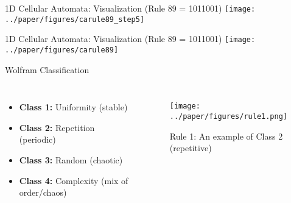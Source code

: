 \begin{frame}{1D Cellular Automata: Visualization (Rule 89 = 1011001)}
    \centering
    \texttt{[image: ../paper/figures/carule89\_step5]}
\end{frame}

\begin{frame}{1D Cellular Automata: Visualization (Rule 89 = 1011001)}
    \centering
    \texttt{[image: ../paper/figures/carule89]}

\end{frame}


\begin{frame}{Wolfram Classification}
    \begin{columns}
        \begin{itemize}
            \item \textbf{Class 1:} Uniformity (stable)
            \item \textbf{Class 2:} Repetition (periodic)
            \item \textbf{Class 3:} Random (chaotic)
            \item \textbf{Class 4:} Complexity (mix of order/chaos)
        \end{itemize}
        \begin{figure}
            \centering
            \texttt{[image: ../paper/figures/rule1.png]}
            \caption{Rule 1: An example of Class 2 (repetitive)}
        \end{figure}
    \end{columns}
\end{frame}



